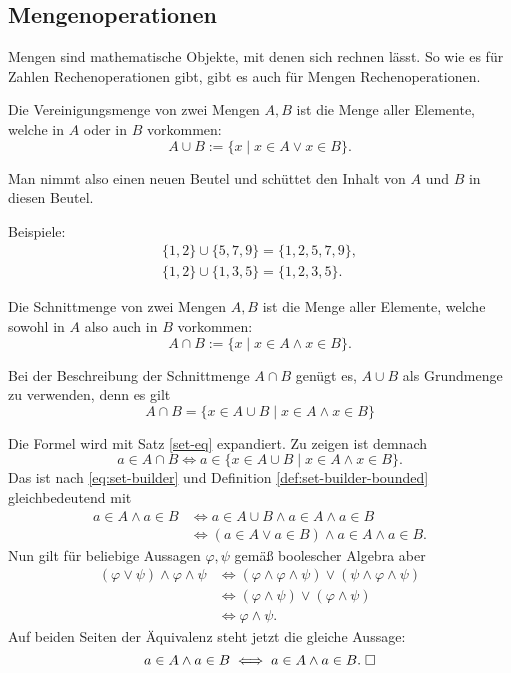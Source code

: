 \newpage
\subsection{Mengenoperationen}

Mengen sind mathematische Objekte, mit denen sich rechnen lässt.
So wie es für Zahlen Rechenoperationen gibt, gibt es auch für
Mengen Rechenoperationen.
\begin{Definition}[Vereinigungsmenge]%
Die Vereinigungsmenge von zwei Mengen $A,B$ ist die Menge aller Elemente,
welche in $A$ oder in $B$ vorkommen:
\[A\cup B := \{x\mid x\in A\lor x\in B\}.\]
\end{Definition}
Man nimmt also einen neuen Beutel und schüttet den Inhalt von $A$
und $B$ in diesen Beutel.

Beispiele:
\begin{gather*}
\{1,2\}\cup\{5,7,9\} = \{1,2,5,7,9\},\\
\{1,2\}\cup\{1,3,5\} = \{1,2,3,5\}.
\end{gather*}

\begin{Definition}[Schnittmenge]%
Die Schnittmenge von zwei Mengen $A,B$ ist die Menge aller Elemente,
welche sowohl in $A$ also auch in $B$ vorkommen:
\[A\cap B := \{x\mid x\in A\land x\in B\}.\]
\end{Definition}
\begin{Satz}
Bei der Beschreibung der Schnittmenge $A\cap B$ genügt es, $A\cup B$ als Grundmenge
zu verwenden, denn es gilt
\[A\cap B = \{x\in A\cup B\mid x\in A\land x\in B\}\]
\end{Satz}
Die Formel wird mit Satz \ref{set-eq} expandiert. Zu zeigen ist demnach
\[a\in A\cap B\iff a\in \{x\in A\cup B\mid x\in A\land x\in B\}.\]
Das ist nach \eqref{eq:set-builder} und Definition
\ref{def:set-builder-bounded} gleichbedeutend mit
\begin{align*}
a\in A\land a\in B&\iff a\in A\cup B\land a\in A\land a\in B\\
&\iff (a\in A\lor a\in B)\land a\in A\land a\in B.
\end{align*}
Nun gilt für beliebige Aussagen $\varphi,\psi$ gemäß boolescher Algebra aber
\begin{align*}
(\varphi\lor\psi)\land\varphi\land\psi
&\iff (\varphi\land\varphi\land\psi)\lor(\psi\land\varphi\land\psi)\\
&\iff (\varphi\land\psi)\lor(\varphi\land\psi)\\
&\iff \varphi\land\psi.
\end{align*}
Auf beiden Seiten der Äquivalenz steht jetzt die gleiche Aussage:%
\[a\in A\land a\in B\iff a\in A\land a\in B.\;\Box\]

